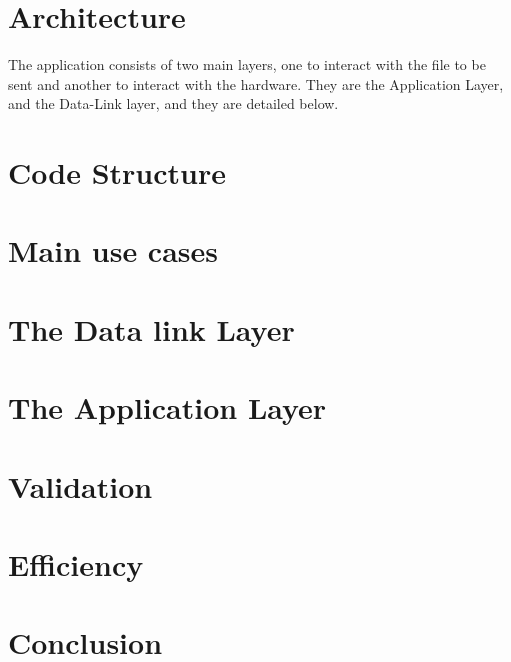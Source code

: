 \documentclass[11pt]{article}
\begin{document}
\section{Architecture}

The application consists of two main layers, one to interact with the file to be sent and another to interact with the hardware. They are the Application Layer, and the Data-Link layer, and they are detailed below.

\section{Code Structure}

\section{Main use cases}

\section{The Data link Layer}

\section{The Application Layer}

\section{Validation}

\section{Efficiency}

\section{Conclusion}
\end{document}
